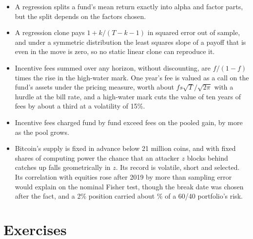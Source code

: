\begin{chapterrefs}
\begin{itemize}
  \item A regression splits a fund's mean return exactly into alpha and factor parts, but the split
        depends on the factors chosen.
  \item A regression clone pays $1+k/(T-k-1)$ in squared error out of sample, and under a symmetric
        distribution the least squares slope of a payoff that is even in the move is zero, so no static
        linear clone can reproduce it.
  \item Incentive fees summed over any horizon, without discounting, are $f/(1-f)$ times the rise in the
        high-water mark. One year's fee is valued as a call on the fund's assets under the pricing
        measure, worth about $fs\sqrt T/\sqrt{2\pi}$ with a hurdle at the bill rate,
        and a high-water mark cuts the value of ten years of fees by about a third at a volatility of
        15\%.
  \item Incentive fees charged fund by fund exceed fees on the pooled gain, by more as the pool grows.
  \item Bitcoin's supply is fixed in advance below 21 million coins, and with fixed shares of computing power
        the chance that an attacker $z$ blocks behind catches up falls geometrically in $z$. Its record is volatile, short and selected. Its correlation with
        equities rose after 2019 by more than sampling error would explain on the nominal Fisher test,
        though the break date was chosen after the fact, and a 2\% position carried about
        \btShareTwo\% of a 60/40 portfolio's risk.
\end{itemize}

\FloatBarrier
\section{Exercises}
\label{sec9:exercises}


\end{chapterrefs}
